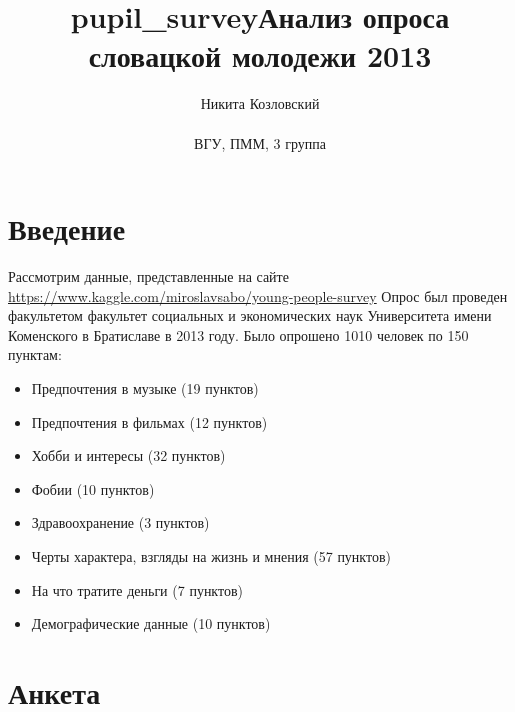 \documentclass[11pt]{article}
\title{pupil\_survey}
\begin{document}
    
    
    \title{Анализ опроса словацкой молодежи 2013}
    \author
{Никита Козловский\\
\\
\normalsize{ВГУ, ПММ, 3 группа}\\}
\date{}
\maketitle

\section{Введение}
    Рассмотрим данные, представленные на сайте \url{https://www.kaggle.com/miroslavsabo/young-people-survey}
	Опрос был проведен факультетом факультет социальных и экономических наук Университета имени Коменского в Братиславе в 2013 году. Было опрошено 1010 человек по 150 пунктам: 
	\begin{itemize}
\item Предпочтения в музыке (19 пунктов)
\item Предпочтения в фильмах (12 пунктов)
\item Хобби и интересы (32 пунктов)
\item Фобии (10 пунктов)
\item Здравоохранение (3 пунктов)
\item Черты характера, взгляды на жизнь и мнения (57 пунктов)
\item На что тратите деньги (7 пунктов)
\item Демографические данные (10 пунктов)
\end{itemize}
    
\pagebreak
\section{Анкета}
\end{document}
